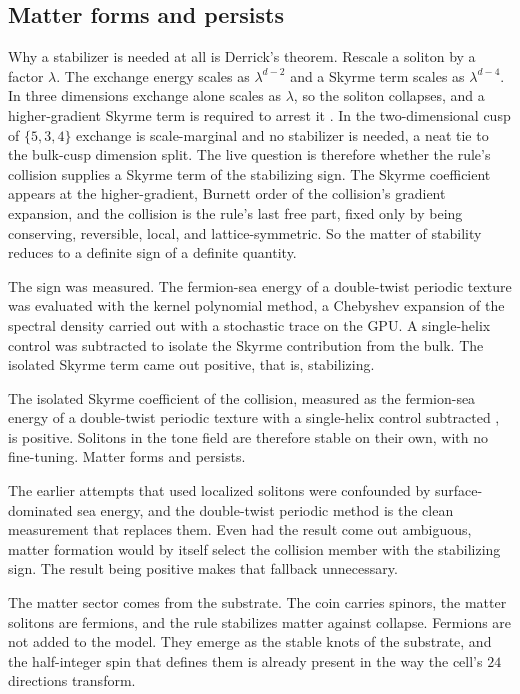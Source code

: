 \subsection{Matter forms and persists}

Why a stabilizer is needed at all is Derrick's theorem. Rescale a soliton by a factor $\lambda$. The exchange
energy scales as $\lambda^{d-2}$ and a Skyrme term scales as $\lambda^{d-4}$. In three dimensions exchange alone
scales as $\lambda$, so the soliton collapses, and a higher-gradient Skyrme term is required to arrest it
\cite{skyrme1962}. In the two-dimensional cusp of $\{5,3,4\}$ exchange is scale-marginal and no stabilizer is
needed, a neat tie to the bulk-cusp dimension split. The live question is therefore whether the rule's collision
supplies a Skyrme term of the stabilizing sign. The Skyrme coefficient appears at the higher-gradient, Burnett
order of the collision's gradient expansion, and the collision is the rule's last free part, fixed only by being
conserving, reversible, local, and lattice-symmetric. So the matter of stability reduces to a definite sign of a
definite quantity.

The sign was measured. The fermion-sea energy of a double-twist periodic texture was evaluated with the kernel
polynomial method, a Chebyshev expansion of the spectral density carried out with a stochastic trace on the GPU.
A single-helix control was subtracted to isolate the Skyrme contribution from the bulk. The isolated Skyrme term
came out positive, that is, stabilizing.

\begin{result}
The isolated Skyrme coefficient of the collision, measured as the fermion-sea energy of a double-twist periodic
texture with a single-helix control subtracted \cite{pollard2026vibetest}, is positive. Solitons in the tone
field are therefore stable on their own, with no fine-tuning. Matter forms and persists.
\end{result}

The earlier attempts that used localized solitons were confounded by surface-dominated sea energy, and the
double-twist periodic method is the clean measurement that replaces them. Even had the result come out
ambiguous, matter formation would by itself select the collision member with the stabilizing sign. The result
being positive makes that fallback unnecessary.


The matter sector comes from the substrate. The coin carries spinors, the matter solitons are fermions, and the
rule stabilizes matter against collapse. Fermions are not added to the model. They emerge as the stable knots of
the substrate, and the half-integer spin that defines them is already present in the way the cell's $24$ directions
transform.
